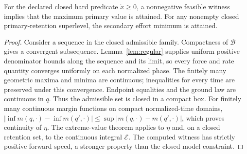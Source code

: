 \begin{proposition}\label{prop:attain}
For the declared closed hard predicate $\dot x\geq0$, a nonnegative feasible witness implies that the maximum primary value is attained. For any nonempty closed primary-retention superlevel, the secondary effort minimum is attained.
\end{proposition}
\begin{proof}
Consider a sequence in the closed admissible family. Compactness of $\mathcal B$ gives a convergent subsequence. Lemma~\ref{lem:regular} supplies uniform positive denominator bounds along the sequence and its limit, so every force and rate quantity converges uniformly on each normalized phase. The finitely many geometric maxima and minima are continuous; inequalities for every time are preserved under this convergence. Endpoint equalities and the ground law are continuous in $q$. Thus the admissible set is closed in a compact box. For finitely many continuous margin functions on compact normalized-time domains, $|\inf m(q,\cdot)-\inf m(q',\cdot)|\leq\sup|m(q,\cdot)-m(q',\cdot)|$, which proves continuity of $\eta$. The extreme-value theorem applies to $\eta$ and, on a closed retention set, to the continuous integral $\mathcal E$. The computed witness has strictly positive forward speed, a stronger property than the closed model constraint.
\end{proof}
